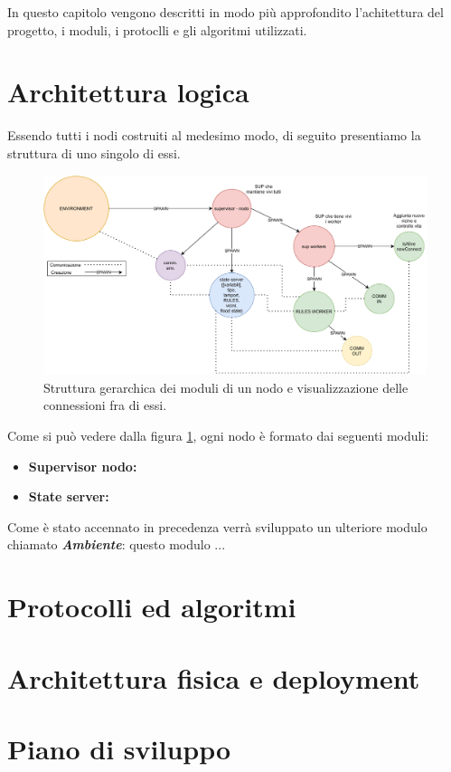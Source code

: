 \documentclass{memoir}
\begin{document}
In questo capitolo vengono descritti in modo più approfondito l'achitettura del progetto, i moduli, i protoclli e gli algoritmi utilizzati.

\section{Architettura logica}

Essendo tutti i nodi costruiti al medesimo modo, di seguito presentiamo la struttura di uno singolo di essi. 

\begin{figure}[h]
\includegraphics[scale=0.6]{draw_nodeworker.pdf}
\centering
\caption{Struttura gerarchica dei moduli di un nodo e visualizzazione delle connessioni fra di essi.}
\label{img:struttura_nodo}
\end{figure}


Come si può vedere dalla figura \ref{img:struttura_nodo}, ogni nodo è formato dai seguenti moduli:
\begin{itemize}
\item \textbf{Supervisor nodo:}
\item \textbf{State server:}
\end{itemize}

Come è stato accennato in precedenza verrà sviluppato un ulteriore modulo chiamato \textbf{\textit{Ambiente}}: questo modulo ...


\section{Protocolli ed algoritmi}
\section{Architettura fisica e deployment}
\section{Piano di sviluppo}
\end{document}
